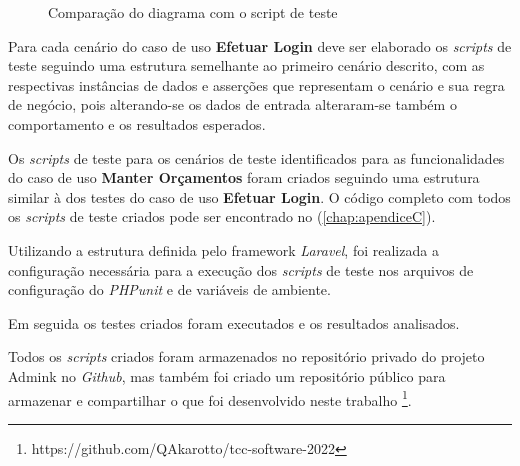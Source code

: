     \begin{figure}[!htb]
        \centering
        \begin{minipage}{\wd0}
	        \caption{Comparação do diagrama com o script de teste}
	        \label{fig:code-and-mind-map}
        \end{minipage}
    \end{figure}
        
    Para cada cenário do caso de uso \textbf{Efetuar Login} deve ser elaborado os \emph{scripts} de teste seguindo uma estrutura semelhante ao primeiro cenário descrito, com as respectivas instâncias de dados e asserções que representam o cenário e sua regra de negócio, pois alterando-se os dados de entrada alteraram-se também o comportamento e os resultados esperados.
        
    Os \emph{scripts} de teste para os cenários de teste identificados para as funcionalidades do caso de uso \textbf{Manter Orçamentos} foram criados seguindo uma estrutura similar à dos testes do caso de uso \textbf{Efetuar Login}. O código completo com todos os \emph{scripts} de teste criados pode ser encontrado no (\autoref{chap:apendiceC}).
 
    Utilizando a estrutura definida pelo framework \emph{Laravel}, foi realizada a configuração necessária para a execução dos \emph{scripts} de teste nos arquivos de configuração do \emph{PHPunit} e de variáveis de ambiente.
        
    Em seguida os testes criados foram executados e os resultados analisados.
        
    Todos os \emph{scripts} criados foram armazenados no repositório privado do projeto Admink no \emph{Github}, mas também foi criado um repositório público para armazenar e compartilhar o que foi desenvolvido neste trabalho \footnote{https://github.com/QAkarotto/tcc-software-2022}.
        
